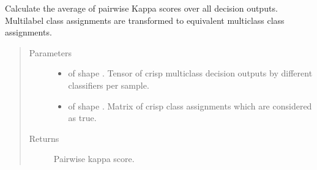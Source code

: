 \documentclass[letterpaper,10pt,english]{sphinxmanual}
\begin{document}
\begin{fulllineitems}
\label{\detokenize{pusion.evaluation.evaluation_metrics:pusion.evaluation.evaluation_metrics.pairwise_kappa_statistic}}
\sphinxAtStartPar
Calculate the average of pairwise Kappa scores over all decision outputs.
Multilabel class assignments are transformed to equivalent multiclass class assignments.
\begin{quote}\begin{description}
\item[{Parameters}] \leavevmode\begin{itemize}
\item {} 
\sphinxAtStartPar
{} \textendash{}  of shape .
Tensor of crisp multiclass decision outputs by different classifiers per sample.

\item {} 
\sphinxAtStartPar
{} \textendash{}  of shape .
Matrix of crisp class assignments which are considered as true.

\end{itemize}

\item[{Returns}] \leavevmode
\sphinxAtStartPar
Pairwise kappa score.

\end{description}\end{quote}

\end{fulllineitems}

\end{document}
